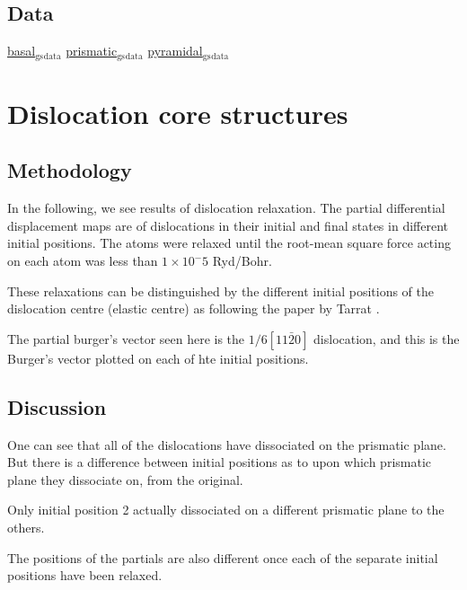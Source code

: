 \documentclass[11pt]{article}
\begin{document}
\subsection{Data}
\label{sec:org666acc7}
\href{file:///home/tigany/Documents/ti/final\_model\_2019-11-12/results\_2019-11-09\_muc/gamma\_surfaces/basal/basal\_gs\_noo\_alat\_energies.dat}{basal\(_{\text{gs}}\)\(_{\text{data}}\)}
\href{file:///home/tigany/Documents/ti/final\_model\_2019-11-12/results\_2019-11-09\_muc/gamma\_surfaces/prismatic/prismatic\_gs\_noo\_alat\_energies.dat}{prismatic\(_{\text{gs}}\)\(_{\text{data}}\)}
\href{file:///home/tigany/Documents/ti/final\_model\_2019-11-12/gamma\_surfaces/pyramidal\_results\_2019-11-13/pyramidal\_gamma\_surface\_2019-11-13.dat}{pyramidal\(_{\text{gs}}\)\(_{\text{data}}\)}
\section{Dislocation core structures}
\label{sec:orgd06199e}

\subsection{Methodology}
\label{sec:org54616a7}
In the following, we see results of dislocation relaxation. The
partial differential displacement maps are of dislocations in
their initial and final states in different initial positions. The
atoms were relaxed until the root-mean square force acting on each
atom was less than \(1\times 10^-5\) Ryd/Bohr.

These relaxations can be distinguished by the different initial
positions of the dislocation centre (elastic centre) as following
the paper by Tarrat \cite{Tarrat2009}.

The partial burger's vector seen here is the \(1/6 [11\bar{2}0]\)
dislocation, and this is the Burger's vector plotted on each of
hte initial positions. 

\subsection{Discussion}
\label{sec:org7fd4825}
One can see that all of the dislocations have dissociated on the
prismatic plane. But there is a difference between initial
positions as to upon which prismatic plane they dissociate on,
from the original. 

Only initial position 2 actually dissociated on a different
prismatic plane to the others. 

The positions of the partials are also different once each of the
separate initial positions have been relaxed. 
\end{document}
